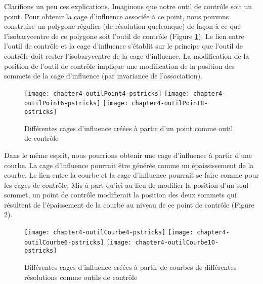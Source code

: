 Clarifions un peu ces explications. Imaginons que notre outil de contrôle soit
un point. Pour obtenir la cage d'influence associée à ce point, nous pouvons
construire un polygone régulier (de résolution quelconque) de façon à ce que
l'isobarycentre de ce polygone soit l'outil de contrôle (Figure \ref{EXTPoi}).
Le lien entre l'outil de contrôle et la cage d'influence s'établit sur le
principe que l'outil de contrôle doit rester l'isobarycentre de la cage
d'influence. La modification de la position de l'outil de contrôle implique
une modification de la position des sommets de la cage d'influence (par
invariance de l'association).

\begin{figure}[ht]
\begin{center}
  \texttt{[image: chapter4-outilPoint4-pstricks]}
  \texttt{[image: chapter4-outilPoint6-pstricks]}
  \texttt{[image: chapter4-outilPoint8-pstricks]}

  \caption[Cages d'influence à partir d'un point] {Différentes cages
d'influence créées à partir d'un point comme outil de contrôle}
  \label{EXTPoi}

\end{center}
\end{figure}

Dans le même esprit, nous pourrions obtenir une cage d'influence à partir
d'une courbe. La cage d'influence pourrait être générée comme un
épaississement de la courbe. Le lien entre la courbe et la cage d'influence
pourrait se faire comme pour les cages de contrôle. Mis à part qu'ici au lieu
de modifier la position d'un seul sommet, un point de contrôle modifierait la
position des deux sommets qui résultent de l'épaissement de la courbe au niveau
de ce point de contrôle (Figure \ref{EXTCou}).

\begin{figure}[ht]
\begin{center}
  \texttt{[image: chapter4-outilCourbe4-pstricks]}
  \texttt{[image: chapter4-outilCourbe6-pstricks]}
  \texttt{[image: chapter4-outilCourbe10-pstricks]}

  \caption[Cages d'influence à partir d'une courbe] {Différentes cages
d'influence créées à partir de courbes de différentes résolutions comme outils
de contrôle}

  \label{EXTCou}

\end{center}
\end{figure}

